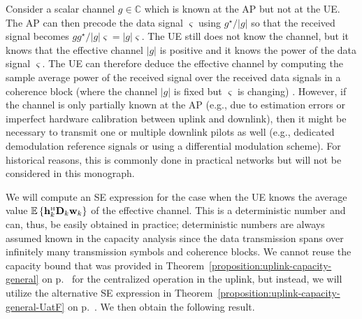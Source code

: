 \begin{remark} \label{remark:pilot-directions}
Consider a scalar channel $g \in \mathbb{C}$ which is  known at the AP but not at the UE. The AP can then precode the data signal $\varsigma$ using $g^\star/|g|$ so that the received signal becomes $g g^\star/|g| \varsigma = |g| \varsigma$. The UE still does not know the channel, but it knows that the effective channel $|g|$ is positive and it knows the power of the data signal $\varsigma$. The UE can therefore deduce the effective channel by computing the sample average power of the received signal over the received data signals in a coherence block (where the channel $|g|$ is fixed but $\varsigma$ is changing) \cite{Ngo2017a}. However, if the channel is only partially known at the AP (e.g., due to estimation errors or imperfect hardware calibration between uplink and downlink), then it might be necessary to transmit one or multiple downlink pilots as well \cite{Interdonato2019b} (e.g., dedicated demodulation reference signals or using a differential modulation scheme). For historical reasons, this is commonly done in practical networks but will not be considered in this monograph.
\end{remark}

We will compute an SE expression for the case when the UE knows the average value $\mathbb{E}\left\{\vect{h}_{k}^{\Htran}\vect{D}_{k}\vect{w}_k\right\}$ of the effective channel. This is a deterministic number and can, thus, be easily obtained in practice; deterministic numbers are always assumed known in the capacity analysis since the data transmission spans over infinitely many transmission symbols and coherence blocks.
We cannot reuse the capacity bound that was provided in Theorem~\ref{proposition:uplink-capacity-general} on p.~\pageref{proposition:uplink-capacity-general} for the centralized operation in the uplink, but instead, we will utilize the alternative SE expression in Theorem~\ref{proposition:uplink-capacity-general-UatF} on p.~\pageref{proposition:uplink-capacity-general-UatF}. We then obtain the following result.


